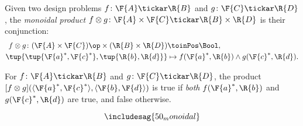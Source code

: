 \begin{definition}\label{def:monoidalproduct}
Given two design problems $f \colon \F{A} \tickar \R{B}$ and $g \colon \F{C} \tickar \R{D}$,
the \emph{monoidal product} $f\otimes g \colon \F{A} \times \F{C} \tickar \R{B} \times \R{D}$ is their conjunction:
\begin{equation}
\begin{aligned}
f \otimes g \colon (\F{A} \times \F{C})\op \times (\R{B} \times \R{D}) & \toinPos \Bool, \\
\tup{\tup{\F{a}^*,\F{c}^*},\tup{\R{b},\R{d}}} &\mapsto f(\F{a}^*,\R{b}) \wedge g(\F{c}^*,\R{d}).
\end{aligned}
\end{equation}
\end{definition}

For $f \colon \F{A} \tickar \R{B}$ and $g \colon \F{C} \tickar \R{D}$, the product $[f \otimes g](\langle \F{a}^*, \F{c}^*\rangle, \langle \F{b},\F{d} \rangle)$ is true if \emph{both} $f(\F{a}^*,\R{b})$ and $g(\F{c}^*,\R{d})$ are true, and false otherwise.

\begin{equation}
\includesag{50_monoidal}
\end{equation}

